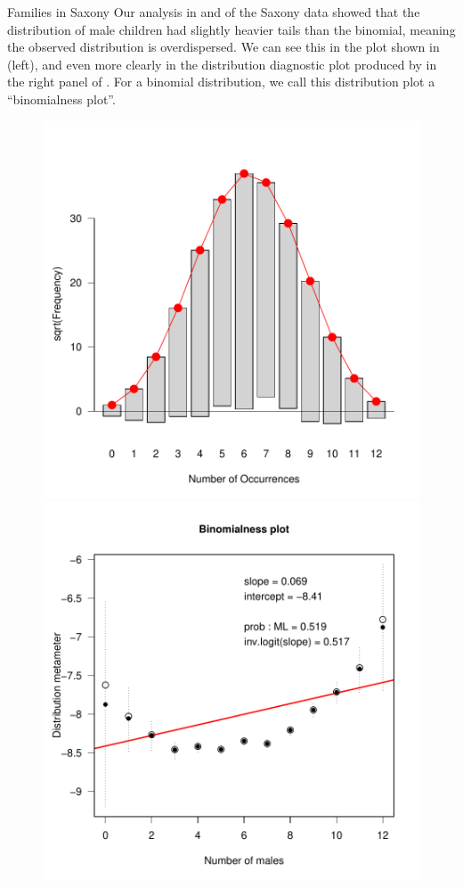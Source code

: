 \documentclass[11pt]{book}
\renewenvironment{knitrout}{\small\renewcommand{\baselinestretch}{.85}}{} %
\begin{document}
\begin{Example}{Families in Saxony}
Our analysis in  and  of
the Saxony data
showed that the distribution of male children had slightly heavier tails
than the binomial, meaning the observed distribution is overdispersed.
We can see this in the  plot shown in  (left),
and even more clearly in the distribution diagnostic
plot produced
by  in the right panel of .
For a binomial distribution, we call
this distribution plot a ``binomialness plot''.

\begin{knitrout}
\color{fgcolor}\begin{kframe}
\begin{alltt}
\hlstd{(}\hlstd{,} \hlstd{=}\hlstd{)}
\hlstd{(} \hlstd{=}\hlstd{,} \hlstd{=}\hlstd{(}\hlstd{=}\hlstd{)))}
  \hlstd{=} \hlstd{,}  \hlstd{=} \hlstd{,}
  \hlstd{=}\hlstd{)}
\end{alltt}
\end{kframe}\begin{figure}[!htbp]


\centerline{\includegraphics[width=.49\textwidth]{ch03/fig/distplot31} 
\includegraphics[width=.49\textwidth]{ch03/fig/distplot32} }


\end{figure}
\end{knitrout}
\end{Example}
\end{document}
